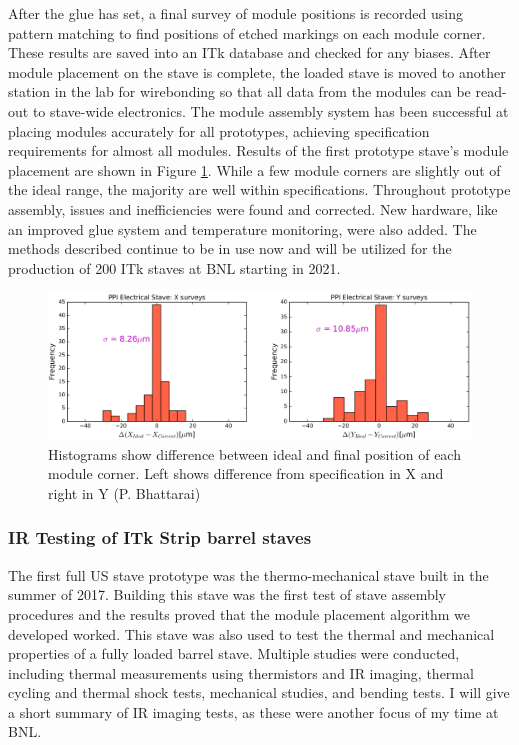 After the glue has set, a final survey of module positions is recorded using pattern matching to find positions of etched markings on each module corner. These results are saved into an ITk database and checked for any biases. After module placement on the stave is complete, the loaded stave is moved to another station in the lab for wirebonding so that all data from the modules can be read-out to stave-wide electronics. The module assembly system has been successful at placing modules accurately for all prototypes, achieving specification requirements for almost all modules. Results of the first prototype stave's module placement are shown in Figure \ref{fig:placementresults}. While a few module corners are slightly out of the ideal range, the majority are well within specifications. Throughout prototype assembly, issues and inefficiencies were found and corrected. New hardware, like an improved glue system and temperature monitoring, were also added. The methods described continue to be in use now and will be utilized for the production of 200 ITk staves at BNL starting in 2021. 

\begin{figure}[!h]
        \centering
    \includegraphics[width=.8\textwidth]{Pictures/placementresults.png}
    \caption{Histograms show difference between ideal and final position of each module corner. Left shows difference from specification in X and right in Y (P. Bhattarai)}
    \label{fig:placementresults}
\end{figure}

\subsubsection{IR Testing of ITk Strip barrel staves}
The first full US stave prototype was the thermo-mechanical stave built in the summer of 2017.  Building this stave was the first test of stave assembly procedures and the results proved that the module placement algorithm we developed worked. This stave was also used to test the thermal and mechanical properties of a fully loaded barrel stave. Multiple studies were conducted, including thermal measurements using thermistors and IR imaging, thermal cycling and thermal shock tests, mechanical studies, and bending tests. I will give a short summary of IR imaging tests, as these were another focus of my time at BNL. 

